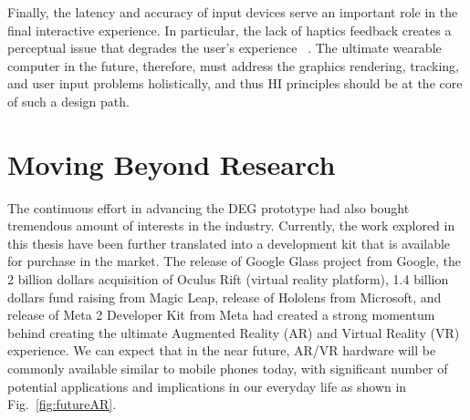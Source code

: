 Finally, the latency and accuracy of input devices serve an important role in the final interactive experience. In particular, the lack of haptics feedback creates a perceptual issue that degrades the user's experience \cite{yang2016perceptual}~\cite{buchmann2004fingartips}. The ultimate wearable computer in the future, therefore, must address the graphics rendering, tracking, and user input problems holistically, and thus HI principles should be at the core of such a design path.

\section{Moving Beyond Research} 


The continuous effort in advancing the DEG prototype had also bought tremendous amount of interests in the industry. Currently, the work explored in this thesis have been further translated into a development kit that is available for purchase in the market. The release of Google Glass project from Google, the 2 billion dollars acquisition of Oculus Rift (virtual reality platform), 1.4 billion dollars fund raising from Magic Leap, release of Hololens from Microsoft, and release of Meta 2 Developer Kit from Meta had created a strong momentum behind creating the ultimate Augmented Reality (AR) and Virtual Reality (VR) experience. We can expect that in the near future, AR/VR hardware will be commonly available similar to mobile phones today, with significant number of potential applications and implications in our everyday life as shown in Fig.~\ref{fig:futureAR}. 


